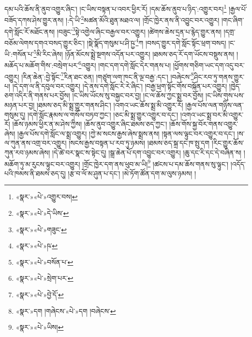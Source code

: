 དམ་པའི་ཆོས་ནི་ནུབ་འགྱུར་ཞིང་། །ང་ཡིས་བསྟན་པ་འབར་ཕྱིར་རོ། །དམ་ཆོས་ནུབ་པ་ཉིད་:འགྱུར་བར།\footnote{«སྣར་»«པེ་»འགྱུར་བས།} །རྒྱལ་པོ་བཟོད་དཀས་ཤེས་གྱུར་ནས། །:དེ་ཡི་\footnote{«སྣར་»«པེ་»དེ་ཡིས་}མཚན་མོའི་ཐུན་མཐའ་ལ། །གྲོང་ཁྱེར་ནས་ནི་འབྱུང་བར་འགྱུར། །གང་ཞིག་དགེ་སློང་རོ་མཐོང་ནས། །བཟུང་\footnote{«སྣར་»«པེ་»གཟུང་}སྟེ་འགྱེལ་ཞིང་བརྒྱལ་བར་འགྱུར། །ཚེགས་ཆེས་དྲན་པ་རྙེད་གྱུར་ནས། །དགྲ་བཅོམ་ལེགས་དགའ་བསད་གྱུར་ཅིང་། །སྡེ་སྣོད་གསུམ་པ་ཤི་ཥྱ་\footnote{«སྣར་»«པེ་»ཥ་}ཀ །བསད་གྱུར་དགེ་སློང་སྟོང་ཕྲག་བསད། །ང་ཡི་:གསོན་པ་\footnote{«སྣར་»«པེ་»བསོན་པ་}མི་རིང་ཞེས། །ཉོན་མོངས་སྨྲེ་སྔགས་འདོན་པར་འགྱུར། །ཐམས་ཅད་རོ་དག་ཡོངས་བསྡུས་ནས། །མཆོད་པ་མཆོག་གིས་:བསྲེག་པར་\footnote{«སྣར་»«པེ་»སྲེག་པར་}འགྱུར། །གང་དག་དགེ་སློང་དེར་གནས་པ། །ཕྱོགས་གཅིག་ཡང་དག་འདུ་བར་འགྱུར། །རིན་ཆེན་:བྱེ་སྟོང་\footnote{«སྣར་»«པེ་»བྱེ་དོ་}རིན་ཐང་ཅན། །གཙུག་ལག་ཁང་ནི་ལྔ་བརྒྱ་:དང་། །བཞེངས་\footnote{«སྣར་»དག །གཞེངས་«པེ་»དག །བཞེངས་}ཤིང་རབ་ཏུ་གནས་གྱུར་པ། །དེ་དག་ལ་ནི་དབུལ་བར་འགྱུར། །དེ་ནས་དགེ་སློང་རེ་རེ་ཞིང་། །བརྒྱ་ཕྲག་སྟོང་གོས་བསྐོན་པར་འགྱུར། །ཁྱེད་ཅག་འདིར་ནི་གནས་པར་བྱོས། །ང་ཡིས་ཡོངས་སུ་བསྐྱང་བར་བྱ། །ང་ལ་ཆོས་ཀྱང་སྨྲ་བར་བྱོས། །ང་ཡིས་གུས་པས་མཉན་པར་བྱ། །ཐམས་ཅད་མི་སྨྲ་གྱུར་གནས་ཤིང་། །འགའ་ཡང་ཆོས་སྨྲ་མི་འགྱུར་རོ། །རྒྱལ་པོས་ལན་གཉིས་ལན་གསུམ་དུ། །དགེ་སློང་རྣམས་ལ་གསོལ་བཏབ་ཀྱང་། །ཅང་མི་སྨྲ་གྱུར་འགྱུར་བ་དང་། །འགའ་ཡང་སྨྲ་བར་མི་འགྱུར་རོ། །ཆོས་ཉམས་ཕྱིར་ན་མ་ཤེས་ཀྱིས། །ཆོས་ནུབ་འགྱུར་ཞིང་ཐམས་ཅད་ཀྱང་། །ཆོས་གོས་སྐྱ་བོར་གནས་འགྱུར་ཞེས། །རྒྱལ་པོས་དགེ་སློང་ལ་སྨྲ་འགྱུར། །ཀྱེ་མ་སངས་རྒྱས་ཞེས་སྨྲས་ནས། །སྟན་ལས་ལྟུང་བར་འགྱུར་བ་དང་། །ས་ལ་ཀུན་ནས་འགྲ་བར་འགྱུར། །སངས་རྒྱས་བསྟན་པ་རབ་ཏུ་ཉམས། །ཐམས་ཅད་སྐྲ་དང་ཁ་སྤུ་དག །རིང་གྱུར་ཆོས་ཀུན་རབ་ཉམས་ཞེས། །དེ་ཚེ་བར་སྣང་ས་སྟེང་དུ། །སྒྲ་ཆེན་པོ་དག་འབྱུང་བར་འགྱུར། །ཆུ་དང་རི་དང་དེ་བཞིན་ས། །མཆོག་ཏུ་མ་རུངས་ལྟུང་བར་འགྱུར། །གྲོང་ཁྱེར་དག་ནས་ཕུབ་མ་ཡི།\footnote{«སྣར་»«པེ་»ཡིས།} །ཚངས་པ་དམ་ཆོས་གནས་སུ་ལྟུང་། །འདོད་པའི་ཁམས་ནི་ཐམས་ཅད་དུ། །རྩ་བ་ལོ་མ་ཤུན་པ་དང་། །མེ་ཏོག་ཚོན་དག་མ་ལུས་ཉམས། །
